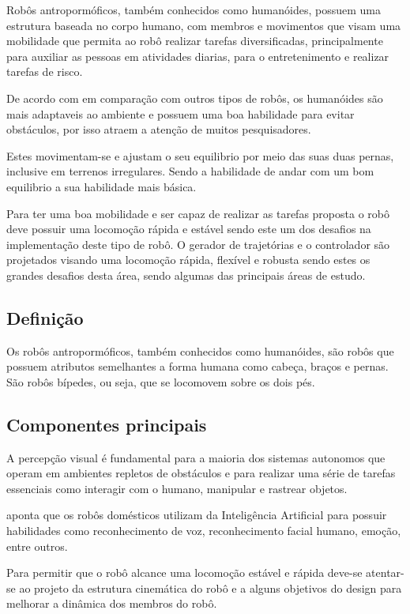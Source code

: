 Robôs antropormóficos, também conhecidos como humanóides, possuem uma estrutura baseada no corpo humano, com  membros e movimentos que visam uma mobilidade que permita ao robô realizar tarefas diversificadas, principalmente para auxiliar as pessoas em atividades diarias, para o entretenimento e realizar tarefas de risco.

De acordo com  em comparação com outros tipos de robôs, os humanóides são mais adaptaveis ao ambiente e possuem uma boa habilidade para evitar obstáculos, por isso atraem a atenção de muitos pesquisadores.

Estes movimentam-se e ajustam o seu equilibrio por meio das suas duas pernas, inclusive em terrenos irregulares. Sendo a habilidade de andar com um bom equilibrio a sua habilidade mais básica.

Para ter uma boa mobilidade e ser capaz de realizar as tarefas proposta o robô deve possuir uma locomoção rápida e estável sendo este um dos desafios na implementação deste tipo de robô. O gerador de trajetórias e o controlador são projetados visando uma locomoção rápida, flexível e robusta sendo estes os grandes desafios desta área, sendo algumas das principais áreas de estudo.

\subsection{Definição}
\label{ssec:defi}

Os robôs antropormóficos, também conhecidos como humanóides, são robôs que possuem atributos semelhantes a forma humana como cabeça, braços e pernas. São robôs bípedes, ou seja, que se locomovem sobre os dois pés.

\subsection{Componentes principais}
\label{ssec:comp}

A percepção visual é fundamental para a maioria dos sistemas autonomos que operam em ambientes repletos de obstáculos e para realizar uma série de tarefas essenciais como interagir com o humano, manipular e rastrear objetos. \cite{Joseph2018} 

 aponta que os robôs domésticos utilizam da Inteligência Artificial para possuir habilidades como reconhecimento de voz, reconhecimento facial humano, emoção, entre outros.

Para permitir que o robô alcance uma locomoção estável e rápida deve-se atentar-se ao projeto da estrutura cinemática do robô e a alguns objetivos do design para melhorar a dinâmica dos membros do robô.\cite{Buschmann2009141}



